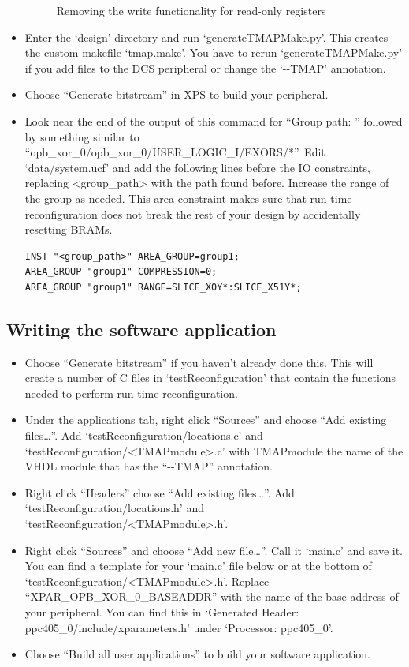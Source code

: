 \documentclass[a4paper,oneside]{memoir}
\begin{document}
\begin{itemize}
\begin{figure}[H]
\caption{Removing the write functionality for read-only registers\label{fig:design1}}
\end{figure}
\item Enter the `design' directory and run `generateTMAPMake.py'. This creates the custom makefile `tmap.make'. You have to rerun `generateTMAPMake.py' if you add files to the DCS peripheral or change the `-\--TMAP' annotation.
\item Choose ``Generate bitstream'' in XPS to build your peripheral.
\item Look near the end of the output of this command for ``Group path: '' followed by something similar to ``opb\_xor\_0/opb\_xor\_0/USER\_LOGIC\_I/EXORS/*''.
Edit `data/system.ucf' and add the following lines before the IO constraints, replacing <group\_path> with the path found before. Increase the range of the group as needed. This area constraint makes sure that  run-time reconfiguration does not break the rest of your design by accidentally resetting BRAMs.

\lstset{language=}
\begin{lstlisting}
INST "<group_path>" AREA_GROUP=group1;
AREA_GROUP "group1" COMPRESSION=0;
AREA_GROUP "group1" RANGE=SLICE_X0Y*:SLICE_X51Y*;
\end{lstlisting}


\end{itemize}

\subsection{Writing the software application}\label{sec:writing_software}
\begin{itemize}
\item Choose ``Generate bitstream'' if you haven't already done this. This will create a number of C files in `testReconfiguration' that  contain the functions needed to perform run-time reconfiguration.
\item Under the applications tab, right click ``Sources'' and choose ``Add existing files\dots''. Add `testReconfiguration/locations.c' and `testReconfiguration/<TMAPmodule>.c' with TMAPmodule the name of the VHDL module that has the ``-\--TMAP'' annotation.
\item Right click ``Headers'' choose ``Add existing files\dots''. Add `testReconfiguration/locations.h' and `testReconfiguration/<TMAPmodule>.h'.
\item Right click ``Sources'' and choose ``Add new file\dots''. Call it `main.c' and save it.\\
You can find a template for your `main.c' file below or at the bottom of `testReconfiguration/<TMAPmodule>.h'. Replace ``XPAR\_OPB\_XOR\_0\_BASEADDR'' with the name of the base address of your peripheral. You can find this in `Generated Header: ppc405\_0/include/xparameters.h' under  `Processor: ppc405\_0'.
\item Choose ``Build all user applications'' to build your software application.
\end{itemize}
\end{document}
